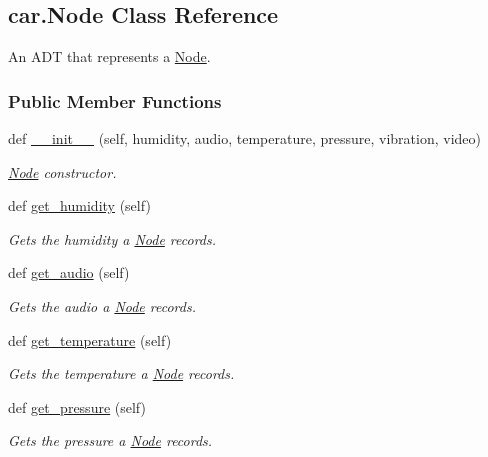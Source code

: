 \hypertarget{classcar_1_1_node}{}\subsection{car.\+Node Class Reference}
\label{classcar_1_1_node}


An A\+DT that represents a \mbox{\hyperlink{classcar_1_1_node}{Node}}.  


\subsubsection*{Public Member Functions}
\begin{DoxyCompactItemize}
\item 
def \mbox{\hyperlink{classcar_1_1_node_af91e35ad2eaf8e4eba35f04a20f15820}{\+\_\+\+\_\+init\+\_\+\+\_\+}} (self, humidity, audio, temperature, pressure, vibration, video)
\begin{DoxyCompactList}\small\item\em \mbox{\hyperlink{classcar_1_1_node}{Node}} constructor. \end{DoxyCompactList}\item 
def \mbox{\hyperlink{classcar_1_1_node_abde2366b1a2fdf09c41a05c96df5cb89}{get\+\_\+humidity}} (self)
\begin{DoxyCompactList}\small\item\em Gets the humidity a \mbox{\hyperlink{classcar_1_1_node}{Node}} records. \end{DoxyCompactList}\item 
def \mbox{\hyperlink{classcar_1_1_node_ad2827b6d495c823e439ea9a2dc166641}{get\+\_\+audio}} (self)
\begin{DoxyCompactList}\small\item\em Gets the audio a \mbox{\hyperlink{classcar_1_1_node}{Node}} records. \end{DoxyCompactList}\item 
def \mbox{\hyperlink{classcar_1_1_node_addde3848b6b6695e89a322077195a88d}{get\+\_\+temperature}} (self)
\begin{DoxyCompactList}\small\item\em Gets the temperature a \mbox{\hyperlink{classcar_1_1_node}{Node}} records. \end{DoxyCompactList}\item 
def \mbox{\hyperlink{classcar_1_1_node_a15c2625783729c018f56e280f0574126}{get\+\_\+pressure}} (self)
\begin{DoxyCompactList}\small\item\em Gets the pressure a \mbox{\hyperlink{classcar_1_1_node}{Node}} records. \end{DoxyCompactList}\item 

\end{DoxyCompactItemize}
